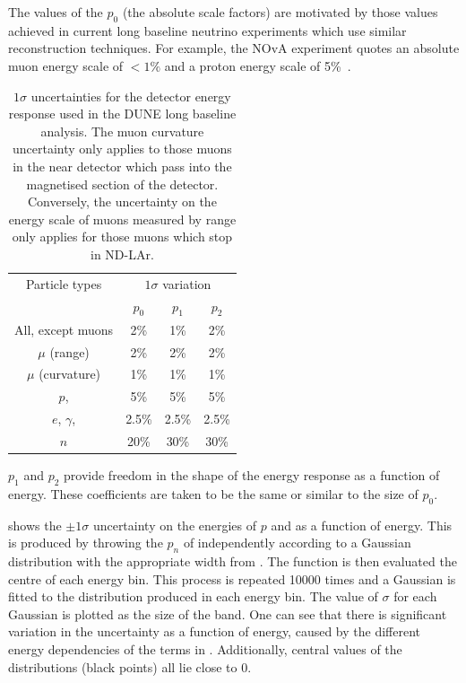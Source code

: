 The values of the $p_{0}$ (the absolute scale factors) are motivated by those values achieved in current long baseline neutrino experiments which use similar reconstruction techniques.
For example, the NOvA experiment quotes an absolute muon energy scale of $<1\%$ and a proton energy scale of 5\%~\cite{nova2018}.

\begin{table}
	\caption[$1\sigma$ uncertainties for the detector energy response used in the DUNE long baseline analysis]{$1\sigma$ uncertainties for the detector energy response used in the DUNE long baseline analysis. The muon curvature uncertainty only applies to those muons in the near detector which pass into the magnetised section of the detector. Conversely, the uncertainty on the energy scale of muons measured by range only applies for those muons which stop in ND-LAr.}
	\label{tab:energyScaleParams}
	\centering
	\begin{tabular}{c c c c}
		\hline
		\hline
		Particle types & \multicolumn{3}{c}{$1\sigma$ variation} \\
		& $p_{0}$ & $p_{1}$ & $p_{2}$ \\
		\hline
		All, except muons      & 2\%   & 1\%   & 2\%   \\
		$\mu$ (range)          & 2\%   & 2\%   & 2\%   \\
		$\mu$ (curvature)      & 1\%   & 1\%   & 1\%   \\
		$p$, \pipm             & 5\%   & 5\%   & 5\%   \\
		$e$, $\gamma$, \pizero & 2.5\% & 2.5\% & 2.5\% \\
		$n$                    & 20\%  & 30\%  & 30\% \\
		\hline
	\end{tabular}
\end{table}

$p_{1}$ and $p_{2}$ provide freedom in the shape of the energy response as a function of energy.
These coefficients are taken to be the same or similar to the size of $p_{0}$.

 shows the $\pm1\sigma$ uncertainty on the energies of $p$ and \pipm as a function of energy.
This is produced by throwing the $p_{n}$ of  independently according to a Gaussian distribution with the appropriate width from . The function is then evaluated the centre of each energy bin.
This process is repeated \num{10000} times and a Gaussian is fitted to the distribution produced in each energy bin.
The value of $\sigma$ for each Gaussian is plotted as the size of the band.
One can see that there is significant variation in the uncertainty as a function of energy, caused by the different energy dependencies of the terms in .
Additionally, central values of the distributions (black points) all lie close to 0.

